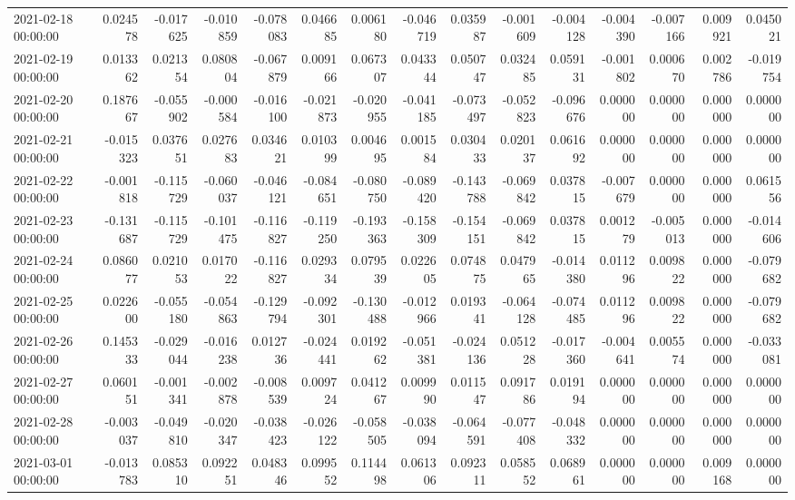 \begin{tabular}{lrrrrrrrrrrrrrr}
2021-02-18 00:00:00 & 0.024578 & -0.017625 & -0.010859 & -0.078083 & 0.046685 & 0.006180 & -0.046719 & 0.035987 & -0.001609 & -0.004128 & -0.004390 & -0.007166 & 0.009921 & 0.045021 \\
2021-02-19 00:00:00 & 0.013362 & 0.021354 & 0.080804 & -0.067879 & 0.009166 & 0.067307 & 0.043344 & 0.050747 & 0.032485 & 0.059131 & -0.001802 & 0.000670 & 0.002786 & -0.019754 \\
2021-02-20 00:00:00 & 0.187667 & -0.055902 & -0.000584 & -0.016100 & -0.021873 & -0.020955 & -0.041185 & -0.073497 & -0.052823 & -0.096676 & 0.000000 & 0.000000 & 0.000000 & 0.000000 \\
2021-02-21 00:00:00 & -0.015323 & 0.037651 & 0.027683 & 0.034621 & 0.010399 & 0.004695 & 0.001584 & 0.030433 & 0.020137 & 0.061692 & 0.000000 & 0.000000 & 0.000000 & 0.000000 \\
2021-02-22 00:00:00 & -0.001818 & -0.115729 & -0.060037 & -0.046121 & -0.084651 & -0.080750 & -0.089420 & -0.143788 & -0.069842 & 0.037815 & -0.007679 & 0.000000 & 0.000000 & 0.061556 \\
2021-02-23 00:00:00 & -0.131687 & -0.115729 & -0.101475 & -0.116827 & -0.119250 & -0.193363 & -0.158309 & -0.154151 & -0.069842 & 0.037815 & 0.001279 & -0.005013 & 0.000000 & -0.014606 \\
2021-02-24 00:00:00 & 0.086077 & 0.021053 & 0.017022 & -0.116827 & 0.029334 & 0.079539 & 0.022605 & 0.074875 & 0.047965 & -0.014380 & 0.011296 & 0.009822 & 0.000000 & -0.079682 \\
2021-02-25 00:00:00 & 0.022600 & -0.055180 & -0.054863 & -0.129794 & -0.092301 & -0.130488 & -0.012966 & 0.019341 & -0.064128 & -0.074485 & 0.011296 & 0.009822 & 0.000000 & -0.079682 \\
2021-02-26 00:00:00 & 0.145333 & -0.029044 & -0.016238 & 0.012736 & -0.024441 & 0.019262 & -0.051381 & -0.024136 & 0.051228 & -0.017360 & -0.004641 & 0.005574 & 0.000000 & -0.033081 \\
2021-02-27 00:00:00 & 0.060151 & -0.001341 & -0.002878 & -0.008539 & 0.009724 & 0.041267 & 0.009990 & 0.011547 & 0.091786 & 0.019194 & 0.000000 & 0.000000 & 0.000000 & 0.000000 \\
2021-02-28 00:00:00 & -0.003037 & -0.049810 & -0.020347 & -0.038423 & -0.026122 & -0.058505 & -0.038094 & -0.064591 & -0.077408 & -0.048332 & 0.000000 & 0.000000 & 0.000000 & 0.000000 \\
2021-03-01 00:00:00 & -0.013783 & 0.085310 & 0.092251 & 0.048346 & 0.099552 & 0.114498 & 0.061306 & 0.092311 & 0.058552 & 0.068961 & 0.000000 & 0.000000 & 0.009168 & 0.000000 \\

\end{tabular}
